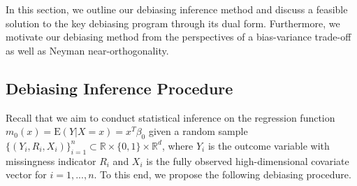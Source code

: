 \documentclass[ejsv2,noshowframe]{imsart}
\theoremstyle{plain}
\theoremstyle{definition}
\theoremstyle{remark}
\begin{document}
In this section, we outline our debiasing inference method and discuss a feasible solution to the key debiasing program through its dual form. Furthermore, we motivate our debiasing method from the perspectives of a bias-variance trade-off as well as Neyman near-orthogonality. 

\subsection{Debiasing Inference Procedure}
\label{subsec:debias_method}

Recall that we aim to conduct statistical inference on the regression function $m_0(x) = \mathrm{E}(Y|X=x)=x^T\beta_0$ given a random sample $\{(Y_i,R_i,X_i)\}_{i=1}^n \subset \mathbb{R}\times \{0,1\} \times \mathbb{R}^d$, where $Y_i$ is the outcome variable with missingness indicator $R_i$ and $X_i$ is the fully observed high-dimensional covariate vector for $i=1,...,n$. To this end, we propose the following debiasing procedure.
\end{document}
